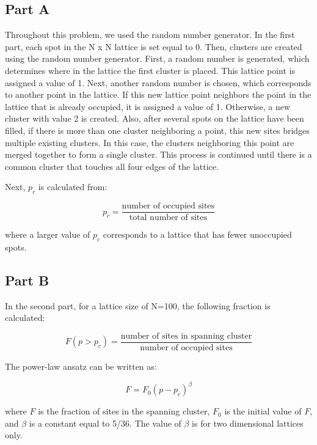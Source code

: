 \documentclass[12pt]{article}
\begin{document}
\subsection{Part A}
\indent \indent Throughout this problem, we used the random number generator.
 In the first part, each spot in the N x N lattice is set equal to 0. Then, clusters are created using the random number generator. First, a random number is generated, which determines where in the lattice the first cluster is placed. This lattice point is assigned a value of 1. Next, another random number is chosen, which corresponds to another point in the lattice. If this new lattice point neighbors the point in the lattice that is already occupied, it is assigned a value of 1. Otherwise, a new cluster with value 2 is created.  \newline
 \indent Also, after several spots on the lattice have been filled, if there is more than one cluster neighboring a point, this new sites bridges multiple existing clusters. In this case, the clusters neighboring this point are merged together to form a single cluster. This process is continued until there is a common cluster that touches all four edges of the lattice. \newline
 
\indent Next, $p_c$ is calculated from:

\begin{equation}
	p_c=\frac{\text{number of occupied sites}}{\text{total number of sites}}
\end{equation}

\indent where a larger value of $p_c$ corresponds to a lattice that has fewer unoccupied spots.

\subsection{Part B}
\indent \indent In the second part, for a lattice size of N=100, the following fraction is calculated:

\begin{equation}
F(p>p_c)=\frac{\text{number of sites in spanning cluster}}{\text{number of occupied sites}}
\end{equation}

\indent The power-law ansatz can be written as:

\begin{equation}
F=F_0(p-p_c)^\beta
\end{equation}

where $F$ is the fraction of sites in the spanning cluster, $F_0$ is the initial value of $F$, and $\beta$ is a constant equal to 5/36. The value of $\beta$ is for two dimensional lattices only.\newline
\end{document}
